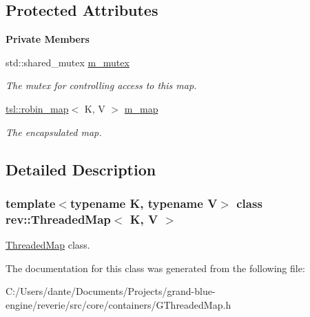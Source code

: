 \subsection*{Protected Attributes}
\begin{Indent}\textbf{ Private Members}\par
\begin{DoxyCompactItemize}
\item 
\mbox{\label{classrev_1_1_threaded_map_a232f07122899c7cdeffe34dff543986a}} 
std\+::shared\+\_\+mutex \mbox{\hyperlink{classrev_1_1_threaded_map_a232f07122899c7cdeffe34dff543986a}{m\+\_\+mutex}}
\begin{DoxyCompactList}\small\item\em The mutex for controlling access to this map. \end{DoxyCompactList}\item 
\mbox{\label{classrev_1_1_threaded_map_a754768aff6ab0abad703d7f467b1739b}} 
\mbox{\hyperlink{classtsl_1_1robin__map}{tsl\+::robin\+\_\+map}}$<$ K, V $>$ \mbox{\hyperlink{classrev_1_1_threaded_map_a754768aff6ab0abad703d7f467b1739b}{m\+\_\+map}}
\begin{DoxyCompactList}\small\item\em The encapsulated map. \end{DoxyCompactList}\end{DoxyCompactItemize}
\end{Indent}


\subsection{Detailed Description}
\subsubsection*{template$<$typename K, typename V$>$\newline
class rev\+::\+Threaded\+Map$<$ K, V $>$}

\mbox{\hyperlink{classrev_1_1_threaded_map}{Threaded\+Map}} class. 

The documentation for this class was generated from the following file\+:\begin{DoxyCompactItemize}
\item 
C\+:/\+Users/dante/\+Documents/\+Projects/grand-\/blue-\/engine/reverie/src/core/containers/G\+Threaded\+Map.\+h\end{DoxyCompactItemize}
